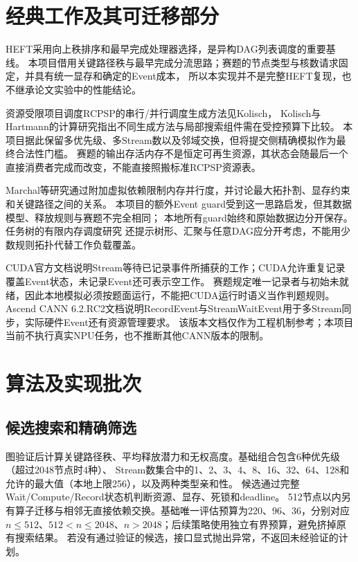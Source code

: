 \documentclass[UTF8,a4paper,11pt,fontset=fandol]{ctexart}
\begin{document}
\section{经典工作及其可迁移部分}
HEFT采用向上秩排序和最早完成处理器选择，是异构DAG列表调度的重要基线\cite{heft}。
本项目借用关键路径秩与最早完成分流思路；赛题的节点类型与核数请求固定，并具有统一显存和确定的Event成本，
所以本实现并不是完整HEFT复现，也不继承论文实验中的性能结论。

资源受限项目调度RCPSP的串行/并行调度生成方法见Kolisch\cite{kolisch}，
Kolisch与Hartmann的计算研究指出不同生成方法与局部搜索组件需在受控预算下比较\cite{hartmann}。
本项目据此保留多优先级、多Stream数以及邻域交换，但将提交侧精确模拟作为最终合法性门槛。
赛题的输出存活内存不是恒定可再生资源，其状态会随最后一个直接消费者完成而改变，不能直接照搬标准RCPSP资源表。

Marchal等研究通过附加虚拟依赖限制内存并行度，并讨论最大拓扑割、显存约束和关键路径之间的关系\cite{memorydag}。
本项目的额外Event guard受到这一思路启发，但其数据模型、释放规则与赛题不完全相同；
本地所有guard始终和原始数据边分开保存。任务树的有限内存调度研究\cite{memorytree}
还提示树形、汇聚与任意DAG应分开考虑，不能用少数规则拓扑代替工作负载覆盖。

CUDA官方文档说明Stream等待已记录事件所捕获的工作；CUDA允许重复记录覆盖Event状态，未记录Event还可表示空工作\cite{cuda}。
赛题规定唯一记录者与初始未就绪，因此本地模拟必须按题面运行，不能把CUDA运行时语义当作判题规则。
Ascend CANN 6.2.RC2文档说明RecordEvent与StreamWaitEvent用于多Stream同步，实际硬件Event还有资源管理要求\cite{ascend}。
该版本文档仅作为工程机制参考；本项目当前不执行真实NPU任务，也不推断其他CANN版本的限制。

\section{算法及实现批次}
\subsection{候选搜索和精确筛选}
图验证后计算关键路径秩、平均释放潜力和无权高度。基础组合包含6种优先级（超过2048节点时4种）、
Stream数集合中的1、2、3、4、8、16、32、64、128和允许的最大值（本地上限256），以及两种类型亲和性。
候选通过完整Wait/Compute/Record状态机判断资源、显存、死锁和deadline。
512节点以内另有算子迁移与相邻无直接依赖交换。基础唯一评估预算为220、96、36，分别对应
$n\leq512$、$512<n\leq2048$、$n>2048$；后续策略使用独立有界预算，避免挤掉原有搜索结果。
若没有通过验证的候选，接口显式抛出异常，不返回未经验证的计划。
\end{document}
